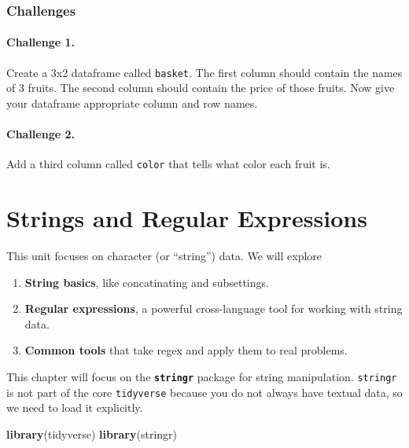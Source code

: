 \documentclass[]{book}
\newenvironment{Shaded}{\begin{snugshade}}{\end{snugshade}}
\newcommand{\KeywordTok}[1]{\textcolor[rgb]{0.13,0.29,0.53}{\textbf{#1}}}
\newcommand{\NormalTok}[1]{#1}
\providecommand{\tightlist}{%
  \setlength{\itemsep}{0pt}\setlength{\parskip}{0pt}}
\begin{document}
\subsection{Challenges}\label{challenges-13}

\subsubsection*{Challenge 1.}\label{challenge-1.-10}

Create a 3x2 dataframe called \texttt{basket}. The first column should
contain the names of 3 fruits. The second column should contain the
price of those fruits. Now give your dataframe appropriate column and
row names.

\subsubsection*{Challenge 2.}\label{challenge-2.-9}

Add a third column called \texttt{color} that tells what color each
fruit is.

\chapter{Strings and Regular
Expressions}\label{strings-and-regular-expressions}

This unit focuses on character (or ``string'') data. We will explore

\begin{enumerate}
\def\labelenumi{\arabic{enumi}.}
\tightlist
\item
  \textbf{String basics}, like concatinating and subsettings.
\item
  \textbf{Regular expressions}, a powerful cross-language tool for
  working with string data.
\item
  \textbf{Common tools} that take regex and apply them to real problems.
\end{enumerate}

This chapter will focus on the \textbf{\texttt{stringr}} package for
string manipulation. \texttt{stringr} is not part of the core
\texttt{tidyverse} because you do not always have textual data, so we
need to load it explicitly.

\begin{Shaded}
\begin{Highlighting}[]
\KeywordTok{library}\NormalTok{(tidyverse)}
\KeywordTok{library}\NormalTok{(stringr)}
\end{Highlighting}
\end{Shaded}
\end{document}
